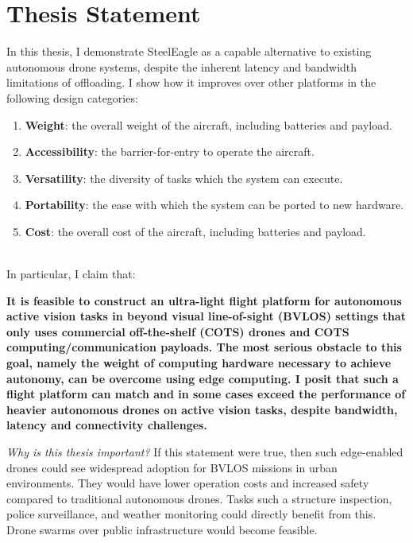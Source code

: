 \section{Thesis Statement}
In this thesis, I demonstrate SteelEagle as a capable alternative to existing autonomous drone systems, despite the inherent latency and bandwidth limitations of offloading. I show how it improves over other platforms in the following design categories:

\begin{enumerate}
\item \textbf{Weight}: the overall weight of the aircraft, including batteries and payload.
\item \textbf{Accessibility}: the barrier-for-entry to operate the aircraft. 
\item \textbf{Versatility}: the diversity of tasks which the system can execute.
\item \textbf{Portability}: the ease with which the system can be ported to new hardware.
\item \textbf{Cost}: the overall cost of the aircraft, including batteries and payload.
\end{enumerate}
\\
In particular, I claim that:

\textbf{It is feasible to construct an ultra-light flight platform for autonomous active vision tasks in beyond visual line-of-sight (BVLOS) settings that only uses commercial off-the-shelf (COTS) drones and COTS computing/communication payloads. The most serious obstacle to this goal, namely the weight of computing hardware necessary to achieve autonomy, can be overcome using edge computing. I posit that such a flight platform can match and in some cases exceed the performance of heavier autonomous drones on active vision tasks, despite bandwidth, latency and connectivity challenges.}

\textit{Why is this thesis important?} If this statement were true, then such edge-enabled drones could see widespread adoption for BVLOS missions in urban environments. They would have lower operation costs and increased safety compared to traditional autonomous drones. Tasks such a structure inspection, police surveillance, and weather monitoring could directly benefit from this. Drone swarms over public infrastructure would become feasible.

